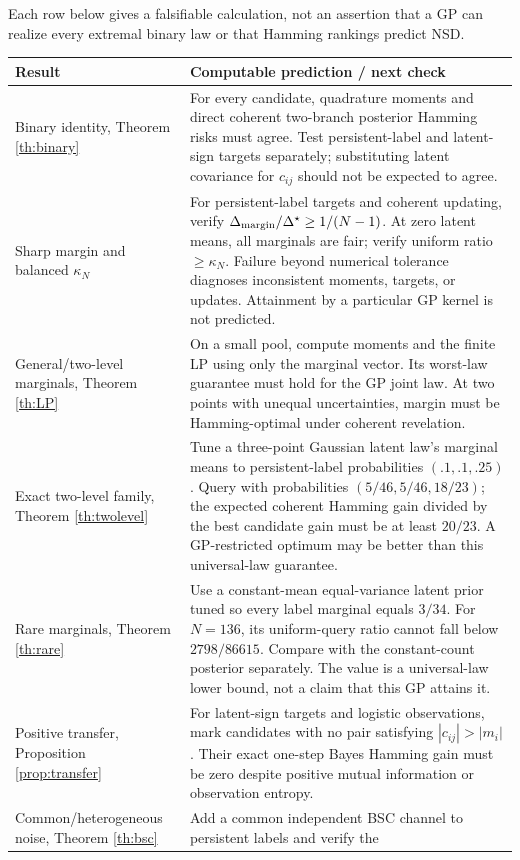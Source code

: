 \documentclass[11pt]{article}
\theoremstyle{definition}
\newcommand{\1}{\mathbf 1}
\begin{document}
Each row below gives a falsifiable calculation, not an assertion that a GP
can realize every extremal binary law or that Hamming rankings predict NSD.
\small
\begin{longtable}{p{}p{}}
\toprule Result & Computable prediction / next check\\\midrule\endhead
Binary identity, Theorem \ref{th:binary}&
For every candidate, quadrature moments and direct coherent two-branch
posterior Hamming risks must agree. Test persistent-label and latent-sign
targets separately; substituting latent covariance for $c_{ij}$ should not
be expected to agree.\\
Sharp margin and balanced $\kappa_N$&
For persistent-label targets and coherent updating, verify
$\Delta_{\rm margin}/\Delta^\star\ge1/(N-1)$.
At zero latent means, all marginals are fair; verify uniform ratio
$\ge\kappa_N$. Failure beyond numerical tolerance diagnoses inconsistent
moments, targets, or updates. Attainment by a particular GP kernel is not
predicted.\\
General/two-level marginals, Theorem \ref{th:LP}&
On a small pool, compute moments and the finite LP using only the marginal
vector. Its worst-law guarantee must hold for the GP joint law.
At two points with unequal uncertainties, margin must be Hamming-optimal
under coherent revelation.\\
Exact two-level family, Theorem \ref{th:twolevel}&
Tune a three-point Gaussian latent law's marginal means to persistent-label
probabilities $(.1,.1,.25)$. Query with probabilities
$(5/46,5/46,18/23)$; the expected coherent Hamming gain divided by the best
candidate gain must be at least $20/23$. A GP-restricted optimum may be
better than this universal-law guarantee.\\
Rare marginals, Theorem \ref{th:rare}&
Use a constant-mean equal-variance latent prior tuned so every label marginal
equals $3/34$. For $N=136$, its uniform-query ratio cannot fall below
$2798/86615$. Compare with the constant-count posterior separately.
The value is a universal-law lower bound, not a claim that this GP attains it.\\
Positive transfer, Proposition \ref{prop:transfer}&
For latent-sign targets and logistic observations, mark candidates with
no pair satisfying $|c_{ij}|>|m_i|$. Their exact one-step Bayes Hamming
gain must be zero despite positive mutual information or observation entropy.\\
Common/heterogeneous noise, Theorem \ref{th:bsc}&
Add a common independent BSC channel to persistent labels and verify the

\end{longtable}
\end{document}

